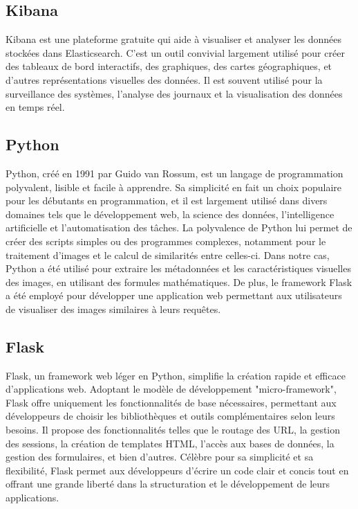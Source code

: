 \documentclass{article}
\begin{document}
	\subsection{Kibana}
	Kibana est une plateforme gratuite qui aide à visualiser et analyser les données stockées dans Elasticsearch. C'est un outil convivial largement utilisé pour créer des tableaux de bord interactifs, des graphiques, des cartes géographiques, et d'autres représentations visuelles des données. Il est souvent utilisé pour la surveillance des systèmes, l'analyse des journaux et la visualisation des données en temps réel.
	
	\subsection{Python}
	Python, créé en 1991 par Guido van Rossum, est un langage de programmation polyvalent, lisible et facile à apprendre. Sa simplicité en fait un choix populaire pour les débutants en programmation, et il est largement utilisé dans divers domaines tels que le développement web, la science des données, l'intelligence artificielle et l'automatisation des tâches. La polyvalence de Python lui permet de créer des scripts simples ou des programmes complexes, notamment pour le traitement d'images et le calcul de similarités entre celles-ci. Dans notre cas, Python a été utilisé pour extraire les métadonnées et les caractéristiques visuelles des images, en utilisant des formules mathématiques. De plus, le framework Flask a été employé pour développer une application web permettant aux utilisateurs de visualiser des images similaires à leurs requêtes.
	
	
	\subsection{Flask}
	Flask, un framework web léger en Python, simplifie la création rapide et efficace d'applications web. Adoptant le modèle de développement "micro-framework", Flask offre uniquement les fonctionnalités de base nécessaires, permettant aux développeurs de choisir les bibliothèques et outils complémentaires selon leurs besoins. Il propose des fonctionnalités telles que le routage des URL, la gestion des sessions, la création de templates HTML, l'accès aux bases de données, la gestion des formulaires, et bien d'autres. Célèbre pour sa simplicité et sa flexibilité, Flask permet aux développeurs d'écrire un code clair et concis tout en offrant une grande liberté dans la structuration et le développement de leurs applications.
	
\end{document}
